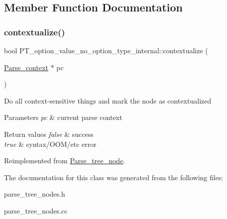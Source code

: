 \subsection{Member Function Documentation}
\mbox{\label{classPT__option__value__no__option__type__internal_a150386fb905d43f09154f649b8081c67}} 
\subsubsection{\texorpdfstring{contextualize()}{contextualize()}}
{\footnotesize\ttfamily bool P\+T\+\_\+option\+\_\+value\+\_\+no\+\_\+option\+\_\+type\+\_\+internal\+::contextualize (\begin{DoxyParamCaption}\item[{\mbox{\hyperlink{structParse__context}{Parse\+\_\+context}} $\ast$}]{pc }\end{DoxyParamCaption})\hspace{0.3cm}{\ttfamily [virtual]}}

Do all context-\/sensitive things and mark the node as contextualized


\begin{DoxyParams}{Parameters}
{\em pc} & current parse context\\
\hline
\end{DoxyParams}

\begin{DoxyRetVals}{Return values}
{\em false} & success \\
\hline
{\em true} & syntax/\+O\+O\+M/etc error \\
\hline
\end{DoxyRetVals}


Reimplemented from \mbox{\hyperlink{classParse__tree__node_a22d93524a537d0df652d7efa144f23da}{Parse\+\_\+tree\+\_\+node}}.



The documentation for this class was generated from the following files\+:\begin{DoxyCompactItemize}
\item 
parse\+\_\+tree\+\_\+nodes.\+h\item 
parse\+\_\+tree\+\_\+nodes.\+cc\end{DoxyCompactItemize}
